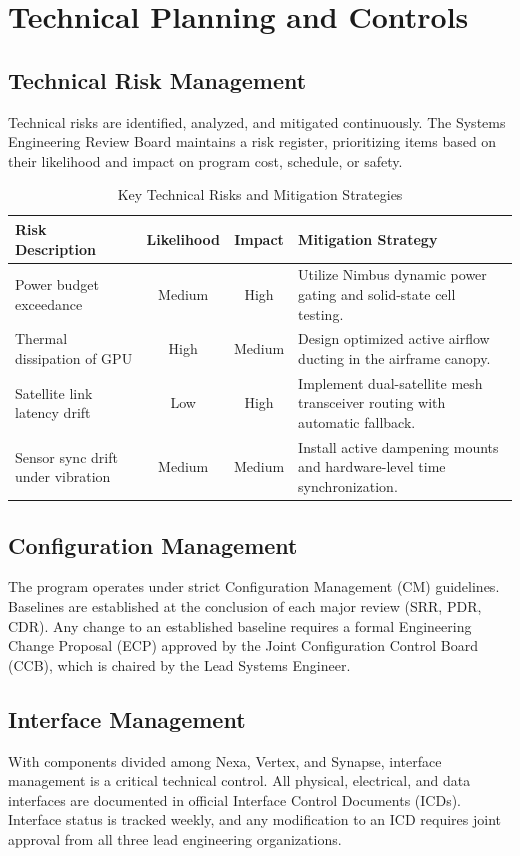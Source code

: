 \section{Technical Planning and Controls}

\subsection{Technical Risk Management}
Technical risks are identified, analyzed, and mitigated continuously. The Systems Engineering Review Board maintains a risk register, prioritizing items based on their likelihood and impact on program cost, schedule, or safety.

\begin{table}[htbp]
\centering
\caption{Key Technical Risks and Mitigation Strategies}
\label{tab:risk_matrix}
\small
\begin{tabularx}{\textwidth}{l c c X}
\toprule
\textbf{Risk Description} & \textbf{Likelihood} & \textbf{Impact} & \textbf{Mitigation Strategy} \\
\midrule
Power budget exceedance & Medium & High & Utilize Nimbus dynamic power gating and solid-state cell testing. \\
Thermal dissipation of GPU & High & Medium & Design optimized active airflow ducting in the airframe canopy. \\
Satellite link latency drift & Low & High & Implement dual-satellite mesh transceiver routing with automatic fallback. \\
Sensor sync drift under vibration & Medium & Medium & Install active dampening mounts and hardware-level time synchronization. \\
\bottomrule
\end{tabularx}
\end{table}

\subsection{Configuration Management}
The program operates under strict Configuration Management (CM) guidelines. Baselines are established at the conclusion of each major review (SRR, PDR, CDR). Any change to an established baseline requires a formal Engineering Change Proposal (ECP) approved by the Joint Configuration Control Board (CCB), which is chaired by the Lead Systems Engineer.

\subsection{Interface Management}
With components divided among Nexa, Vertex, and Synapse, interface management is a critical technical control. All physical, electrical, and data interfaces are documented in official Interface Control Documents (ICDs). Interface status is tracked weekly, and any modification to an ICD requires joint approval from all three lead engineering organizations.
